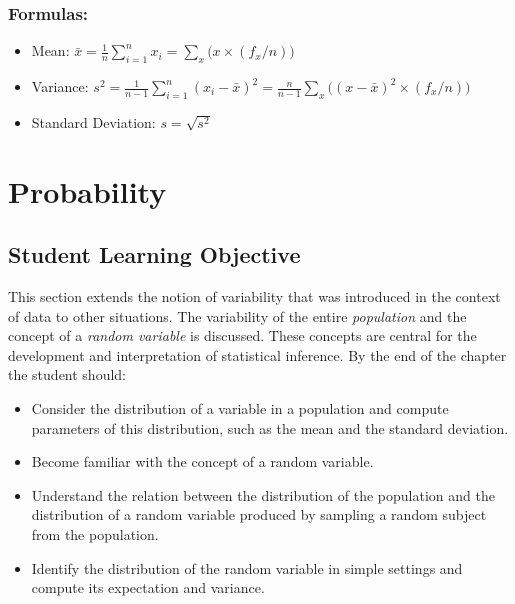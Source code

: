 \documentclass[
]{krantz}
\theoremstyle{definition}
\theoremstyle{definition}
\theoremstyle{definition}
\theoremstyle{remark}
\begin{document}
\hypertarget{formulas}{%
\subsection*{Formulas:}\label{formulas}}


\begin{itemize}
\item
  Mean:
  \(\bar x = \frac{1}{n} \sum_{i=1}^n x_i = \sum_x \big(x \times (f_x/n)\big)\)
\item
  Variance:
  \(s^2 = \frac{1}{n-1}\sum_{i=1}^n (x_i - \bar x)^2 = \frac{n}{n-1}\sum_x \big((x - \bar x)^2\times (f_x/n)\big)\)
\item
  Standard Deviation: \(s = \sqrt{s^2}\)
\end{itemize}

\hypertarget{ChapProbability}{%
\chapter{Probability}\label{ChapProbability}}

\hypertarget{student-learning-objective}{%
\section{Student Learning Objective}\label{student-learning-objective}}

This section extends the notion of variability that was introduced in
the context of data to other situations. The variability of the entire
\emph{population} and the concept of a \emph{random variable} is discussed. These
concepts are central for the development and interpretation of
statistical inference. By the end of the chapter the student should:

\begin{itemize}
\item
  Consider the distribution of a variable in a population and compute
  parameters of this distribution, such as the mean and the standard
  deviation.
\item
  Become familiar with the concept of a random variable.
\item
  Understand the relation between the distribution of the population
  and the distribution of a random variable produced by sampling a
  random subject from the population.
\item
  Identify the distribution of the random variable in simple settings
  and compute its expectation and variance.
\end{itemize}
\end{document}
